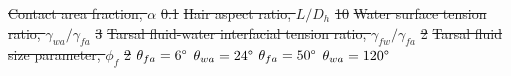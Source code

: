\documentclass[vruler,JEB]{COB}%
\makeatletter
\newcommand{\lyxmathsym}[1]{\ifmmode\begingroup\def\b@ld{bold}
  \text{\ifx\math@version\b@ld\bfseries\fi#1}\endgroup\else#1\fi}
\providecommand{\DIFdel}[1]{{\protect\color{red}\sout{#1}}}                      %
\providecommand{\DIFdelbegin}{} %
\providecommand{\DIFdelend}{} %
\providecommand{\DIFdelFL}[1]{\DIFdel{#1}} %
\makeatother
\begin{document}
\DIFdelbegin %
\DIFdelFL{Contact area fraction, $\alpha$ }%
\DIFdelFL{0.1}%
\DIFdelFL{Hair aspect ratio, $L/D_{h}$ }%
\DIFdelFL{10}%
\DIFdelFL{Water surface tension ratio, $\gamma_{wa}/\gamma_{fa}$ }%
\DIFdelFL{3}%
\DIFdelFL{Tarsal fluid-water interfacial tension ratio, $\gamma_{fw}/\gamma_{fa}$ }%
\DIFdelFL{2}%
\DIFdelFL{Tarsal fluid size parameter, $\phi_{f}$ }%
\DIFdelFL{2}%
\DIFdelFL{$\theta_{fa}=6\lyxmathsym{\textdegree}$}%
\DIFdelFL{$\theta_{wa}=24\lyxmathsym{\textdegree}$}%
\DIFdelFL{$\theta_{fa}=50\lyxmathsym{\textdegree}$}%
\DIFdelFL{$\theta_{wa}=120\lyxmathsym{\textdegree}$
}%
\DIFdelend %
\end{document}
